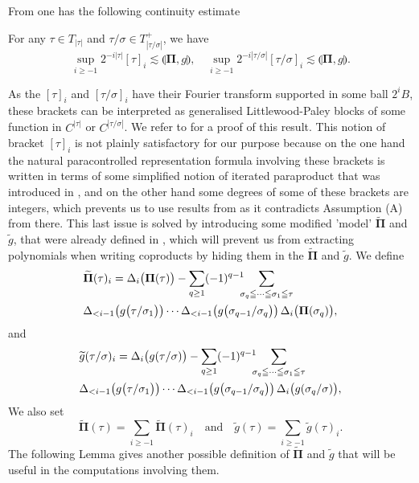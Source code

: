 \documentclass[11pt]{preprint}
\def\PPi{\boldsymbol{\Pi}}
\begin{document}
From \cite{LocalExpansionsParacSystems} one has the following continuity estimate
	\begin{proposition} \label{prop_RegCrochets}
		For any $\tau\in T_{|\tau|}$ and $\tau/\sigma\in T_{|\tau/ \sigma|}^+$,  we have
		$$ 
		\sup_{i\geq -1} 2^{-i|\tau|} [\tau]_i \lesssim \llparenthesis \PPi , g\rrparenthesis, \quad 
		\sup_{i\geq -1} 2^{-i|\tau/\sigma|} [\tau/\sigma]_i \lesssim \llparenthesis \PPi , g\rrparenthesis.
		$$
			
	\end{proposition}
	As the $[\tau]_i$ and $[\tau/\sigma]_i$ have their Fourier transform supported in some ball $2^iB$, these brackets can be interpreted as generalised Littlewood-Paley blocks of some function in $C^{|\tau|}$ or $C^{|\tau/\sigma|}$. We refer to \cite{LocalExpansionsParacSystems} for a proof of this result. This notion of bracket $[\tau]_i$ is not plainly satisfactory for our purpose because on the one hand the natural paracontrolled representation formula involving these brackets is written in terms of some simplified notion of iterated paraproduct that was introduced in \cite{LocalExpansionsParacSystems}, and on the other hand some degrees of some of these brackets are integers, which prevents us to use results from \cite{LocalExpansionsParacSystems} as it contradicts Assumption (A) from there. 
This last issue is solved by introducing some modified 'model' $\widetilde{ \PPi}$ and $\widetilde{ g}$, that were already defined in \cite{LocalExpansionsParacSystems}, which will prevent us from extracting polynomials when writing coproducts by hiding them in the $\widetilde{\PPi}$ and $\widetilde{ g}$.
	We define
	\begin{equation}\label{eqdef_pitilde} \begin{split}
			&\widetilde{ \PPi}(\tau)_i =  \Delta_i\big( { \PPi}(\tau)\big) 
		- \sum_{q\geq 1}(-1)^{q-1} \hspace{-0.2cm} \sum_{\sigma_q\leqq \cdots \leqq\sigma_1 \leqq \tau} \\ &  \Delta_{<i-1}\big({ g}\big(\tau/\sigma_1\big)\big)\cdots \Delta_{<i-1}\big({ g}\big(\sigma_{q-1}/\sigma_q\big)\big) \, \Delta_i\big({ \PPi}(\sigma_q)\big), 
	\end{split}\end{equation}
	and
	\begin{equation}\label{eqdef_gtilde}\begin{split}
			&\widetilde{ g}(\tau/\sigma)_i =  \Delta_i\big( { g}(\tau/\sigma)\big) 
			- \sum_{q\geq 1}(-1)^{q-1} \hspace{-0.2cm} \sum_{\sigma_q\leqq \cdots \leqq\sigma_1 \leqq \tau} \\ & \Delta_{<i-1}\big({ g}\big(\tau/\sigma_1\big)\big)\cdots \Delta_{<i-1}\big({ g}\big(\sigma_{q-1}/\sigma_q\big)\big) \, \Delta_i\big({ g}(\sigma_q/\sigma)\big), 
		\end{split}
	\end{equation}
	We also set 
	$$
	\widetilde{ \PPi}(\tau) = \sum_{i\geq -1} \widetilde{ \PPi}(\tau)_i
	\quad \text{and} \quad 
	\widetilde{ g}(\tau) = \sum_{i\geq -1} \widetilde{ g}(\tau)_i.
	$$
	The following Lemma gives another possible definition of $\widetilde{ \PPi}$ and $\widetilde{ g}$ that will be useful in the computations involving them.
	
\end{document}
